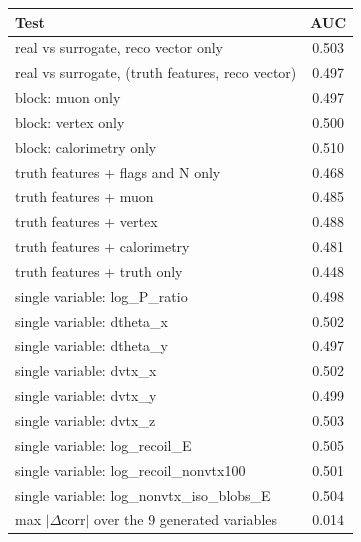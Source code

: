 \begin{tabular}{lc}
\toprule
Test & AUC \\
\midrule
real vs surrogate, reco vector only & 0.503 \\
real vs surrogate, (truth features, reco vector) & 0.497 \\
\midrule
block: muon only & 0.497 \\
block: vertex only & 0.500 \\
block: calorimetry only & 0.510 \\
truth features + flags and N only & 0.468 \\
truth features + muon & 0.485 \\
truth features + vertex & 0.488 \\
truth features + calorimetry & 0.481 \\
truth features + truth only & 0.448 \\
single variable: log\_P\_ratio & 0.498 \\
single variable: dtheta\_x & 0.502 \\
single variable: dtheta\_y & 0.497 \\
single variable: dvtx\_x & 0.502 \\
single variable: dvtx\_y & 0.499 \\
single variable: dvtx\_z & 0.503 \\
single variable: log\_recoil\_E & 0.505 \\
single variable: log\_recoil\_nonvtx100 & 0.501 \\
single variable: log\_nonvtx\_iso\_blobs\_E & 0.504 \\
\midrule
max $|\Delta$corr$|$ over the 9 generated variables & 0.014 \\
\bottomrule
\end{tabular}
